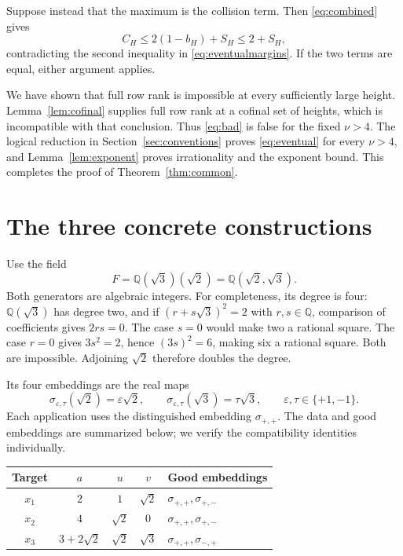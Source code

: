 \documentclass[11pt]{article}
\theoremstyle{definition}
\theoremstyle{remark}
\theoremstyle{plain}
\newcommand{\Q}{\mathbb Q}
\begin{document}
Suppose instead that the maximum is the collision term. Then
\eqref{eq:combined} gives
\[
 C_H\le2(1-b_H)+S_H\le2+S_H,
\]
contradicting the second inequality in \eqref{eq:eventualmargins}.
If the two terms are equal, either argument applies.

We have shown that full row rank is impossible at every sufficiently
large height. Lemma~\ref{lem:cofinal} supplies full row rank at a cofinal
set of heights, which is incompatible with that conclusion. Thus
\eqref{eq:bad} is false for the fixed \(\nu>4\). The logical reduction
in Section~\ref{sec:conventions} proves \eqref{eq:eventual} for every
\(\nu>4\), and Lemma~\ref{lem:exponent} proves irrationality and the
exponent bound. This completes the proof of Theorem~\ref{thm:common}.

\section{The three concrete constructions}\label{sec:examples}
Use the field
\begin{equation}\label{eq:field}
 F=\Q(\sqrt3)(\sqrt2)=\Q(\sqrt2,\sqrt3).
\end{equation}
Both generators are algebraic integers. For completeness, its degree is
four: \(\Q(\sqrt3)\) has degree two, and if
\((r+s\sqrt3)^2=2\) with \(r,s\in\Q\), comparison of coefficients
gives \(2rs=0\). The case \(s=0\) would make two a rational square.
The case \(r=0\) gives \(3s^2=2\), hence \((3s)^2=6\), making six
a rational square. Both are impossible. Adjoining \(\sqrt2\) therefore
doubles the degree.

Its four embeddings are the real maps
\begin{equation}\label{eq:signs}
 \sigma_{\varepsilon,\tau}(\sqrt2)=\varepsilon\sqrt2,
 \qquad \sigma_{\varepsilon,\tau}(\sqrt3)=\tau\sqrt3,
 \qquad \varepsilon,\tau\in\{+1,-1\}.
\end{equation}
Each application uses the distinguished embedding \(\sigma_{+,+}\).
The data and good embeddings are summarized below; we verify the
compatibility identities individually.

\begin{center}
\begin{tabular}{@{}c c c c l@{}}
\toprule
Target & \(a\) & \(u\) & \(v\) & Good embeddings\\
\midrule
\(x_1\) & \(2\) & \(1\) & \(\sqrt2\) & \(\sigma_{+,+},\sigma_{+,-}\)\\
\(x_2\) & \(4\) & \(\sqrt2\) & \(0\) & \(\sigma_{+,+},\sigma_{+,-}\)\\
\(x_3\) & \(3+2\sqrt2\) & \(\sqrt2\) & \(\sqrt3\) & \(\sigma_{+,+},\sigma_{-,+}\)\\
\bottomrule
\end{tabular}
\end{center}
\end{document}
